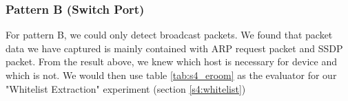 \subsubsection{Pattern B (Switch Port)}
For pattern B, we could only detect broadcast packets. We found that packet data we have captured is mainly contained with ARP request packet and SSDP packet.
\newline\newline
From the result above, we knew which host is necessary for device and which is not.  
We would then use table \ref{tab:s4_eroom} as the evaluator for our "Whitelist Extraction" experiment (section \ref{s4:whitelist})  
